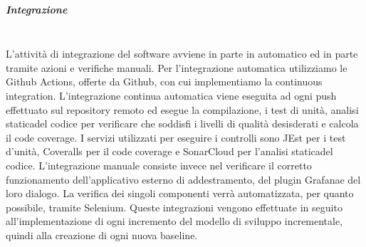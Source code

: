 
\subparagraph{Integrazione} \mbox{} \\
L'attività di integrazione del software avviene in parte in automatico ed in parte tramite azioni e verifiche manuali.
\newline
Per l'integrazione automatica utilizziamo le Github Actions, offerte da Github, con cui implementiamo la continuous integration. L'integrazione continua automatica viene eseguita ad ogni push effettuato sul repository remoto ed esegue la compilazione, i test di unità, analisi statica\glosp del codice per verificare che soddisfi i livelli di qualità desisderati e calcola il code coverage. I servizi utilizzati per eseguire i controlli sono JEst per i test d'unità, Coveralls per il code coverage e SonarCloud per l'analisi statica\glosp del codice.
\newline
L'integrazione manuale consiste invece nel verificare il corretto funzionamento dell'applicativo esterno di addestramento, del plugin Grafana\glosp e del loro dialogo. La verifica dei singoli componenti verrà automatizzata, per quanto possibile, tramite Selenium\glo. Queste integrazioni vengono effettuate in seguito all'implementazione di ogni incremento del modello di sviluppo incrementale, quindi alla creazione di ogni nuova baseline\glo.

